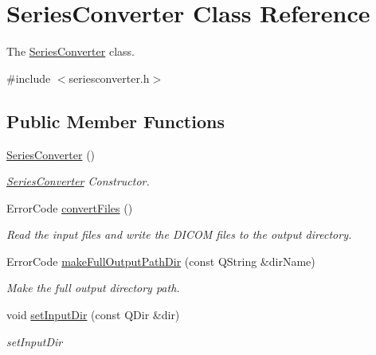 \hypertarget{class_series_converter}{}\section{Series\+Converter Class Reference}
\label{class_series_converter}


The \hyperlink{class_series_converter}{Series\+Converter} class.  




{\ttfamily \#include $<$seriesconverter.\+h$>$}

\subsection*{Public Member Functions}
\begin{DoxyCompactItemize}
\item 
\mbox{\label{class_series_converter_a807a4cbcfab6044a4635f72b72d6a0d3}} 
\hyperlink{class_series_converter_a807a4cbcfab6044a4635f72b72d6a0d3}{Series\+Converter} ()
\begin{DoxyCompactList}\small\item\em \hyperlink{class_series_converter}{Series\+Converter} Constructor. \end{DoxyCompactList}\item 
Error\+Code \hyperlink{class_series_converter_ac8729b482ee4eda39bd6a9e710f4449c}{convert\+Files} ()
\begin{DoxyCompactList}\small\item\em Read the input files and write the D\+I\+C\+OM files to the output directory. \end{DoxyCompactList}\item 
Error\+Code \hyperlink{class_series_converter_a1c8cd4b434f931afdbd719375aa64904}{make\+Full\+Output\+Path\+Dir} (const Q\+String \&dir\+Name)
\begin{DoxyCompactList}\small\item\em Make the full output directory path. \end{DoxyCompactList}\item 
void \hyperlink{class_series_converter_aeae7772dca9eaa2ad685cb7c3b79dbf0}{set\+Input\+Dir} (const Q\+Dir \&dir)
\begin{DoxyCompactList}\small\item\em set\+Input\+Dir \end{DoxyCompactList}\item 

\end{DoxyCompactItemize}
